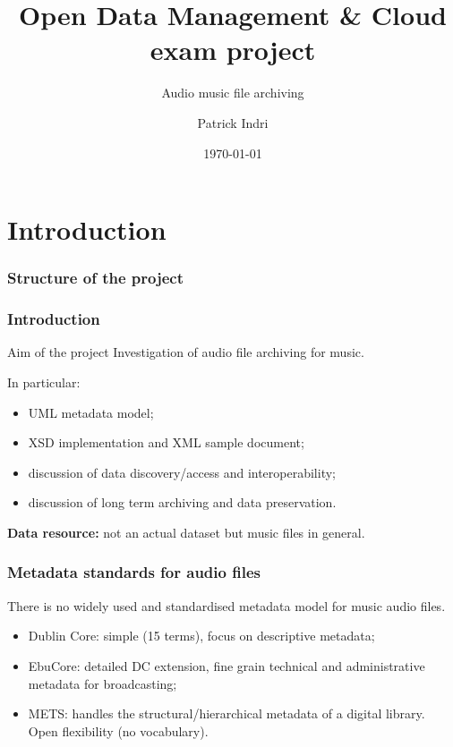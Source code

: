 \documentclass{beamer}
\title{Open Data Management \& Cloud\\exam project}
\subtitle{Audio music file archiving}
\author{Patrick Indri}
\date{\today}
\newcommand\rb[1]{\textcolor{ThemeRed}{\textbf{#1}}}
\begin{document}
	\setcounter{showSlideNumbers}{0}

	\frame{\titlepage}

	\setcounter{framenumber}{0}
	\setcounter{showSlideNumbers}{1}



\section{Introduction}

  \begin{frame}
    \frametitle{Structure of the project}
  \end{frame}



  \begin{frame}
    \frametitle{Introduction}

    \begin{block}{Aim of the project}
      Investigation of audio file archiving for music.
    \end{block}

    \vspace{1em}

    In particular:
    \begin{itemize}
      \item UML metadata model;
      \item XSD implementation and XML sample document;
      \item discussion of data discovery/access and interoperability;
      \item discussion of long term archiving and data preservation.
    \end{itemize}

    \vspace{1em}

    \rb{Data resource:} not an actual dataset but music files in general.

  \end{frame}



  \begin{frame}
    \frametitle{Metadata standards for audio files}

    There is no widely used and standardised metadata model for music audio files.

    \vspace{1em}

    \begin{itemize}
      \itemsep1em
      \item Dublin Core: simple (15 terms), focus on descriptive metadata;
      \item EbuCore: detailed DC extension, fine grain technical and administrative metadata for broadcasting;
      \item METS: handles the structural/hierarchical metadata of a digital library. Open flexibility (no vocabulary).
    \end{itemize}
  \end{frame}
\end{document}

